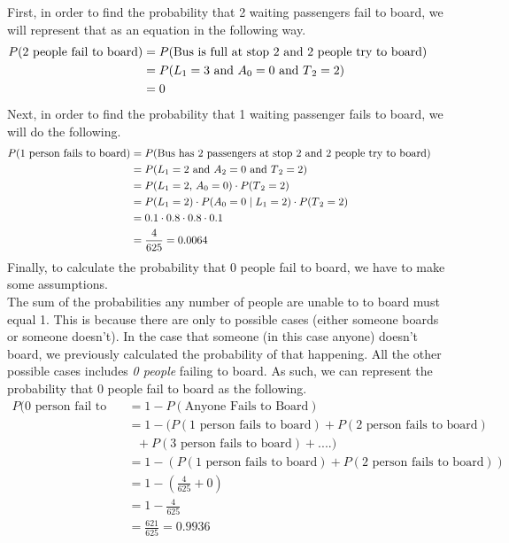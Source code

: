 \documentclass{article}
\numberwithin{equation}{section}
\newcommand{\eqname}[1]{\tag*{#1}}%
\begin{document}
First, in order to find the probability that 2 waiting passengers fail to board, we will represent that as an equation in the following way.
\begin{align} 
	    \label{Probability 2 People Fail to Board}
		P(\textrm{2 people fail to board)} &= P(\text{Bus is full at stop 2 and 2 people try to board})\eqname{} \\
		&= P(L\textsubscript{1} = 3 \text{ and } A\textsubscript{0} = 0 \text{ and } T\textsubscript{2} = 2) \eqname{} \\
		&= 0
\end{align}
Next, in order to find the probability that 1 waiting passenger fails to board, we will do the following.
\begin{align} 
	    \label{Probability 1 People Fail to Board}
		P(\textrm{1 person fails to board)} &= P(\text{Bus has 2 passengers at stop 2 and 2 people try to board})\eqname{} \\
		&= P(L\textsubscript{1} = 2 \text{ and } A\textsubscript{2} = 0 \text{ and } T\textsubscript{2} = 2) \eqname{} \\
		&= P(L\textsubscript{1} = 2 \text{, } A\textsubscript{0} = 0) \cdot P(T\textsubscript{2} = 2) \eqname{} \\
		&= P(L\textsubscript{1} = 2) \cdot P(A\textsubscript{0} = 0 \mid L\textsubscript{1} = 2) \cdot P(T\textsubscript{2} = 2) \eqname{} \\
		&= 0.1 \cdot 0.8 \cdot 0.8 \cdot 0.1 \eqname{} \\
		&= \frac{4}{625} = 0.0064
\end{align}
Finally, to calculate the probability that 0 people fail to board, we have to make some assumptions. 
\\ \indent
The sum of the probabilities any number of people are unable to to board must equal 1. This is because there are only to possible cases (either someone boards or someone doesn't). In the case that someone (in this case anyone) doesn't board, we previously calculated the probability of that happening. All the other possible cases includes \textit{0 people} failing to board. As such, we can represent the probability that 0 people fail to board as the following. 
\begin{align} 
	    \label{Probability 0 People Fail to Board}
		P(\textrm{0 person fail to board)} &= 1 - P(\text{Anyone Fails to Board})\eqname{} \\
		&= 1 - (P(\text{1 person fails to board}) + P(\text{2 person fails to board}) \eqname{} \\ & \ \ \  + P(\text{3 person fails to board}) + ....) \eqname{} \\
		&= 1 - (P(\text{1 person fails to board}) + P(\text{2 person fails to board})) \eqname{} \\
		&= 1 - (\frac{4}{625} + 0) \eqname{} \\
		&= 1 - \frac{4}{625} \eqname{} \\
		&= \frac{621}{625} = 0.9936
\end{align}
\end{document}
